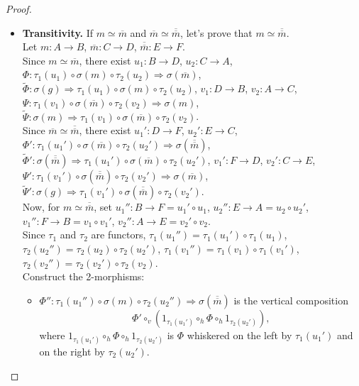 \documentclass[a4paper,10pt]{article}
\theoremstyle{plain}
\theoremstyle{definition}
\theoremstyle{remark}
\begin{document}
\begin{proof}
\begin{itemize}
    \item \textbf{Transitivity.} If \(m \simeq \overline{m}\) and \(\overline{m} \simeq \overline{\overline{m}}\), let's prove that \(m \simeq \overline{\overline{m}}\). \\
          Let \(m: A \to B\), \(\overline{m}: C \to D\), \(\overline{\overline{m}}: E \to F\). \\
          Since \(m \simeq  \overline{m}\), there exist \(u_1: B \to D\), \(u_2: C \to A\), \(\Phi: \tau_1(u_1) \circ \sigma(m) \circ \tau_2(u_2) \Rightarrow \sigma(\overline{m})\), \(\tilde{\Phi}: \sigma(g) \Rightarrow \tau_1(u_1) \circ \sigma(m) \circ \tau_2(u_2)\), \(v_1: D \to B\), \(v_2: A \to C\), \(\Psi: \tau_1(v_1) \circ \sigma(\overline{m}) \circ \tau_2(v_2) \Rightarrow \sigma(m)\), \(\tilde{\Psi}: \sigma(m) \Rightarrow \tau_1(v_1) \circ \sigma(\overline{m}) \circ \tau_2(v_2)\). \\
          Since \(\overline{m} \simeq \overline{\overline{m}}\), there exist \(u_1': D \to F\), \(u_2': E \to C\), \(\Phi': \tau_1(u_1') \circ \sigma(\overline{m}) \circ \tau_2(u_2') \Rightarrow \sigma(\overline{\overline{m}})\), \(\tilde{\Phi}': \sigma(\overline{\overline{m}}) \Rightarrow \tau_1(u_1') \circ \sigma(\overline{m}) \circ \tau_2(u_2')\), \(v_1': F \to D\), \(v_2': C \to E\), \(\Psi': \tau_1(v_1') \circ \sigma(\overline{\overline{m}}) \circ \tau_2(v_2') \Rightarrow \sigma(\overline{m})\), \(\tilde{\Psi}': \sigma(g) \Rightarrow \tau_1(v_1') \circ \sigma(\overline{\overline{m}}) \circ \tau_2(v_2')\). \\
          Now, for \(m \simeq \overline{\overline{m}} \), set \(u_1'': B \to F = u_1' \circ u_1\), \(u_2'': E \to A = u_2 \circ u_2'\), \(v_1'': F \to B = v_1 \circ v_1'\), \(v_2'': A \to E = v_2' \circ v_2\). \\
          Since \(\tau_1\) and \(\tau_2\) are functors, \(\tau_1(u_1'' ) = \tau_1(u_1') \circ \tau_1(u_1)\), \(\tau_2(u_2'') = \tau_2(u_2) \circ \tau_2(u_2')\), \(\tau_1(v_1'') = \tau_1(v_1) \circ \tau_1(v_1')\), \(\tau_2(v_2'') = \tau_2(v_2') \circ \tau_2(v_2)\). \\
          Construct the 2-morphisms:
          \begin{itemize}
            \item \(\Phi'': \tau_1(u_1'') \circ \sigma(m) \circ \tau_2(u_2'') \Rightarrow \sigma(\overline{\overline{m}})\) is the vertical composition
                  \[ \Phi' \circ_v \left( 1_{\tau_1(u_1')} \circ_h \Phi \circ_h 1_{\tau_2(u_2')} \right), \]
                  where $1_{\tau_1(u_1')} \circ_h \Phi \circ_h 1_{\tau_2(u_2')}$ is \(\Phi\) whiskered on the left by \(\tau_1(u_1')\) and on the right by \(\tau_2(u_2')\).

\end{itemize}
\end{itemize}
\end{proof}
\end{document}
